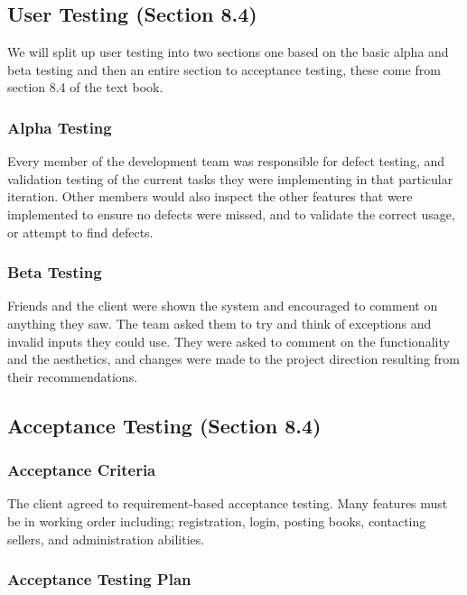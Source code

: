 \documentclass[11pt]{article}
\begin{document}
	\subsection{User Testing (Section 8.4)}
		We will split up user testing into two sections one based on the basic alpha and beta testing and then an entire section to acceptance testing, these come from section 8.4 of the text book.
		\subsubsection{Alpha Testing}

			Every member of the development team was responsible for defect testing, and validation testing of the current tasks they were implementing in that particular iteration. 
			Other members would also inspect the other features that were implemented to ensure no defects were missed, and to validate the correct usage, or attempt to find defects.

		\subsubsection{Beta Testing}

			Friends and the client were shown the system and encouraged to comment on anything they saw. 
			The team asked them to try and think of exceptions and invalid inputs they could use. 
			They were asked to comment on the functionality and the aesthetics, and changes were made to the project direction resulting from their recommendations.

	\subsection{Acceptance Testing (Section 8.4)}

		\subsubsection{Acceptance Criteria}

			The client agreed to requirement-based acceptance testing. 
			Many features must be in working order including; registration, login, posting books, contacting sellers, and administration abilities.

		\subsubsection{Acceptance Testing Plan}
\end{document}
